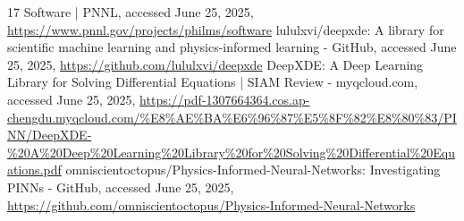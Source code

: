 \begin{thebibliography}{17}
     Software | PNNL, accessed June 25, 2025, \url{https://www.pnnl.gov/projects/philms/software}
     lululxvi/deepxde: A library for scientific machine learning and physics-informed learning - GitHub, accessed June 25, 2025, \url{https://github.com/lululxvi/deepxde}
     DeepXDE: A Deep Learning Library for Solving Differential Equations | SIAM Review - myqcloud.com, accessed June 25, 2025, \url{https://pdf-1307664364.cos.ap-chengdu.myqcloud.com/\%E8\%AE\%BA\%E6\%96\%87\%E5\%8F\%82\%E8\%80\%83/PINN/DeepXDE-\%20A\%20Deep\%20Learning\%20Library\%20for\%20Solving\%20Differential\%20Equations.pdf}
     omniscientoctopus/Physics-Informed-Neural-Networks: Investigating PINNs - GitHub, accessed June 25, 2025, \url{https://github.com/omniscientoctopus/Physics-Informed-Neural-Networks}
\end{thebibliography}
